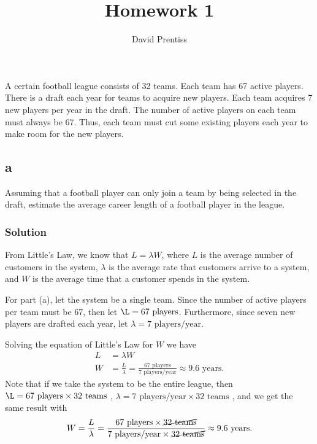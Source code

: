 \documentclass{amsart}
\title{Homework 1}
\author{David Prentiss}
\begin{document}
\maketitle

\section{} %
A certain football league consists of 32 teams. Each team has 67 active
players. There is a draft each year for teams to acquire new players. Each
team acquires 7 new players per year in the draft. The number of active
players on each team must always be 67. Thus, each team must cut some
existing players each year to make room for the new players.

\subsection*{a}
Assuming that a football player can only join a team by being selected
in the draft, estimate the average career length of a football player in
the league.


\subsubsection*{Solution}

From Little's Law, we know that $L=\lambda W$, where $L$ is the average number
of customers in the system, $\lambda$ is the average rate that customers arrive
to a system, and $W$ is the average time that a customer spends in the system.

For part (a), let the system be a single team. Since the number of active
players per team must be 67, then let $\L = 67 \text{ players}$. Furthermore, since seven
new players are drafted each year, let $\lambda = 7 \text{ players/year}$.

Solving the equation of Little's Law for $W$ we have
\begin{align}
  L &= \lambda W \\
  W &= \frac{L}{\lambda} = \frac{67 \text{ players}}{7 \text{ players/year}} \approx 9.6 \text{ years}.
\end{align}
Note that if we take the system to be the entire league, then
$\L = 67 \text{ players} \times 32 \text{ teams}$
,
$\lambda = 7 \text{ players/year}\times 32 \text{ teams}$
, and we get the same result with
\begin{equation}
  W = \frac{L}{\lambda} = \frac{67 \text{ players} \times \cancel{32 \text{ teams}}}
  {7 \text{ players/year}\times \cancel{32 \text{ teams}}} \approx 9.6 \text{ years}.
\end{equation}
\end{document}
